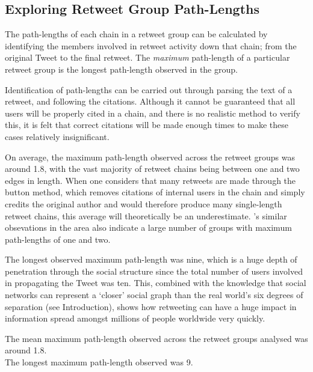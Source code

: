 \subsection{Exploring Retweet Group Path-Lengths}
The path-lengths of each chain in a retweet group can be calculated by identifying the members involved in retweet activity down that chain; from the original Tweet to the final retweet. The \textit{maximum} path-length of a particular retweet group is the longest path-length observed in the group.

Identification of path-lengths can be carried out through parsing the text of a retweet, and following the citations. Although it cannot be guaranteed that all users will be properly cited in a chain, and there is no realistic method to verify this, it is felt that correct citations will be made enough times to make these cases relatively insignificant.

On average, the maximum path-length observed across the retweet groups was around 1.8, with the vast majority of retweet chains being between one and two edges in length. When one considers that many retweets are made through the button method, which removes citations of internal users in the chain and simply credits the original author and would therefore produce many single-length retweet chains, this average will theoretically be an underestimate. \cite{kwak10}'s similar obsevations in the area also indicate a large number of groups with maximum path-lengths of one and two.

The longest observed maximum path-length was nine, which is a huge depth of penetration through the social structure since the total number of users involved in propagating the Tweet was ten. This, combined with the knowledge that social networks can represent a `closer' social graph than the real world's six degrees of separation (see Introduction), shows how retweeting can have a huge impact in information spread amongst millions of people worldwide very quickly.

\begin{myobservation}
\label{observation:path-length}
The mean maximum path-length observed across the retweet groups analysed was around 1.8.\\
The longest maximum path-length observed was 9.
\end{myobservation}

